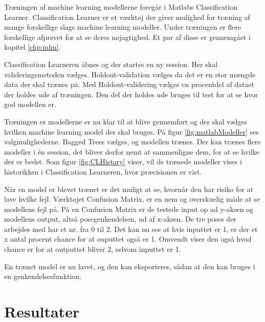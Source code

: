 Træningen af machine learning modellerne foregår i Matlabs Classification Learner\citep{matlabClassificationLearner}. Classification Learner er et værktøj der giver mulighed for træning af mange forskellige slags machine learning modeller. Under træningen er flere forskellige afprøvet for at se deres nøjagtighed. Et par af disse er gennemgået i kapitel \ref{chp:mlm}.

Classification Learneren åbnes og der startes en ny session. Her skal valideringsmetoden vælges. Holdout-validation vælges da det er en stor mængde data der skal trænes på. Med Holdout-validering vælges en procentdel af dataet der holdes ude af træningen. Den del der holdes ude bruges til test for at se hvor god modellen er\citep{matlabValidation}.


Træningen er modellerne er nu klar til at blive gennemført og der skal vælges hvilken machine learning model der skal bruges. På figur \ref{fig:matlabModeller} ses valgmulighederne.
Bagged Trees vælges, og modellen trænes.
Der kan trænes flere modeller i én session, det bliver derfor nemt at sammenligne dem, for at se hvilke der er bedst. Som figur \ref{fig:CLHistory} viser, vil de trænede modeller vises i historikken i Classification Learneren, hvor præcisionen er vist.

Når en model er blevet trænet er det muligt at se, hvornår den har risiko for at lave hvilke fejl. Værktøjet Confusion Matrix, er en nem og overskuelig måde at se modellens fejl på. På en Confusion Matrix er de testede input op ad y-aksen og modellens output, altså posegenkendelsen, ud af x-aksen. De tre poses der arbejdes med har et nr. fra 0 til 2. Det kan nu ses at hvis inputtet er 1, er der et x antal procent chance for at ouputtet også er 1. Omvendt viser den også hvad chance er for at outputtet bliver 2, selvom inputtet er 1.


En trænet model er nu lavet, og den kan eksporteres, sådan at den kan bruges i en genkendelsesfunktion.

\section{Resultater}